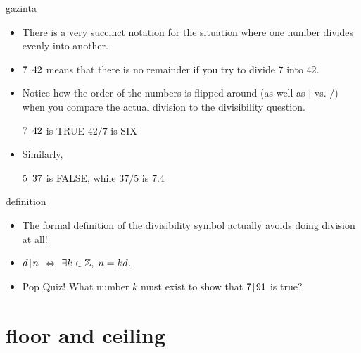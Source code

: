 \documentclass[landscape]{beamer}
\begin{document}
\begin{frame}{gazinta}
\begin{itemize}
\item There is a very succinct notation for the situation where one number divides evenly into another.\pause

\item $7 \!\mid\! 42$ means that there is no remainder if you try to divide $7$ into $42$. \pause
\item Notice how the order of the numbers is flipped around (as well as $\mid$ vs. $/$) when you compare the actual division to the divisibility question.\newline

$7\!\mid\! 42$ is TRUE \hspace{.3in} $42/7$ is SIX \pause

\item Similarly, \newline

$5 \!\mid\! 37$ is FALSE, \hspace{.1in}while\hspace{.1in} $37/5$ is $7.4$
 \end{itemize}
\end{frame}

\begin{frame}{definition}
\begin{itemize}
\item The formal definition of the divisibility symbol actually avoids doing division at all! \pause
\item \rule{0pt}{18pt}  $d \!\mid\! n$ \hspace{8pt} $\iff$ \hspace{8pt}  $\exists k \in {\mathbb Z}, \; n = kd$. \pause
\item Pop Quiz!  What number $k$ must exist to show that $7\!\mid\! 91$ is true? 
\end{itemize}
\end{frame}


\section{floor and ceiling}
\end{document}
